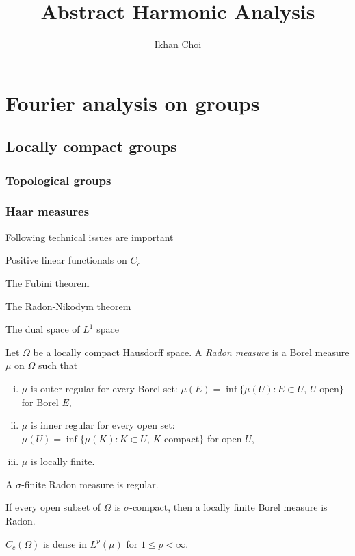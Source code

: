 \documentclass{../../large}
\begin{document}
\title{Abstract Harmonic Analysis}
\author{Ikhan Choi}
\maketitle
\tableofcontents



\part{Fourier analysis on groups}
\chapter{Locally compact groups}
\section{Topological groups}
\section{Haar measures}

\begin{prb}
Following technical issues are important
\begin{parts}
\item Positive linear functionals on $C_c$
\item The Fubini theorem
\item The Radon-Nikodym theorem
\item The dual space of $L^1$ space
\end{parts}
\end{prb}

\begin{prb}
Let $\Omega$ be a locally compact Hausdorff space.
A \emph{Radon measure} is a Borel measure $\mu$ on $\Omega$ such that
\begin{enumerate}[(i)]
\item $\mu$ is outer regular for every Borel set: $\mu(E)=\inf\{\mu(U):E\subset U,\,U\text{ open}\}$ for Borel $E$,
\item $\mu$ is inner regular for every open set: $\mu(U)=\inf\{\mu(K):K\subset U,\,K\text{ compact}\}$ for open $U$,
\item $\mu$ is locally finite.
\end{enumerate}
\begin{parts}
\item A $\sigma$-finite Radon measure is regular.
\item If every open subset of $\Omega$ is $\sigma$-compact, then a locally finite Borel measure is Radon.
\item $C_c(\Omega)$ is dense in $L^p(\mu)$ for $1\le p<\infty$.
\end{parts}
\end{prb}
\end{document}
